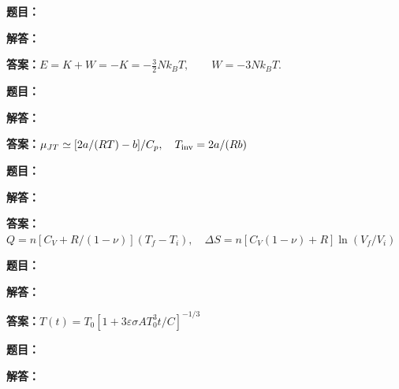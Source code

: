 \documentclass[lang=cn,color=blue,11pt]{elegantbook}
\begin{document}
\noindent\textbf{题目：}
\par\noindent\textbf{解答：}
\par\noindent\textbf{答案：}\(\displaystyle 
E=K+W=-K=-\frac32Nk_BT,\qquad W=-3Nk_BT.
\)\par
\par\smallskip\noindent\hrulefill\par\medskip
{}\par
\noindent\textbf{题目：}
\par\noindent\textbf{解答：}
\par\noindent\textbf{答案：}\(\displaystyle \mu_{JT}\simeq[2a/(RT)-b]/C_p,\quad T_{\rm inv}=2a/(Rb)\)\par
\par\smallskip\noindent\hrulefill\par\medskip
{}\par
\noindent\textbf{题目：}
\par\noindent\textbf{解答：}
\par\noindent\textbf{答案：}\(\displaystyle Q=n[C_V+R/(1-\nu)](T_f-T_i),\quad\Delta S=n[C_V(1-\nu)+R]\ln(V_f/V_i)\)\par
\par\smallskip\noindent\hrulefill\par\medskip
{}\par
\noindent\textbf{题目：}
\par\noindent\textbf{解答：}
\par\noindent\textbf{答案：}\(\displaystyle T(t)=T_0[1+3\varepsilon\sigma AT_0^3t/C]^{-1/3}\)\par
\par\smallskip\noindent\hrulefill\par\medskip
{}\par
\noindent\textbf{题目：}
\par\noindent\textbf{解答：}
\end{document}
